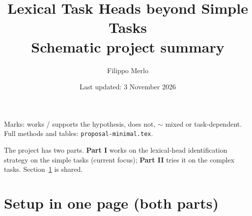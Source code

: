 \documentclass[10pt,a4paper]{article}
\title{Lexical Task Heads beyond Simple Tasks\\\large Schematic project summary}
\author{Filippo Merlo}
\date{Last updated: 3 November 2026}
\newcommand{\yes}{\textcolor{green!45!black}{\ding{51}}}
\newcommand{\no}{\textcolor{red!70!black}{\ding{55}}}
\newcommand{\mixed}{\textcolor{orange!80!black}{$\sim$}}
\begin{document}
\maketitle
\vspace{-1em}

\noindent Marks: \yes{} works / supports the hypothesis, \no{} does not, \mixed{} mixed or task-dependent. Full methods and tables: \texttt{proposal-minimal.tex}.

\noindent The project has two parts. \textbf{Part I} works on the lexical-head identification strategy on the simple tasks (current focus); \textbf{Part II} tries it on the complex tasks. Section~\ref{sec:setup} is shared.

\section{Setup in one page (both parts)}\label{sec:setup}
\end{document}

